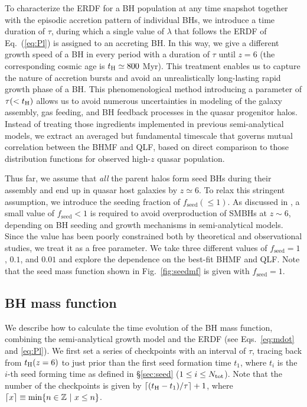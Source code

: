 \documentclass[twocolumn, twocolappendix]{aastex63}
\newcommand{\tlife}{\tau}
\newcommand{\fseed}{f_\mathrm{seed}}
\newcommand{\Nt}{N_\mathrm{t}}
\begin{document}
\begin{CJK*}{UTF8}{gbsn}
To characterize the ERDF for a BH population at any time snapshot together with the episodic 
accretion pattern of individual BHs, 
we introduce a time duration of $\tlife$, during which a single value of $\lambda$ that follows 
the ERDF of Eq.~(\ref{eq:Pl}) is assigned to an accreting BH.
In this way, we give a different growth speed of a BH in every period with a duration of $\tlife$ until $z=6$ 
(the corresponding cosmic age is $t_{\rm H}\simeq 800$ Myr).
This treatment enables us to capture the nature of accretion bursts and avoid an unrealistically 
long-lasting rapid growth phase of a BH.
This phenomenological method introducing a parameter of $\tlife(<t_{\rm H})$ allows us to avoid 
numerous uncertainties in modeling of the galaxy assembly, gas feeding, and BH feedback processes in the quasar 
progenitor halos.
Instead of treating those ingredients implemented in previous semi-analytical models, we extract 
an averaged but fundamental timescale that governs mutual correlation between the BHMF and QLF,
based on direct comparison to those distribution functions for observed high-$z$ quasar population.


Thus far, we assume that {\it all} the parent halos form seed BHs during their assembly and end up in quasar host galaxies by $z\simeq 6$.
To relax this stringent assumption, we introduce the seeding fraction of $\fseed (\leq 1)$.
As discussed in \citet{2009ApJ...696.1798T}, a small value of $\fseed <1$ is required to avoid overproduction of SMBHs at $z\sim 6$,
depending on BH seeding and growth mechanisms in semi-analytical models.
Since the value has been poorly constrained both by theoretical and observational studies, we treat it as a free parameter.
We take three different values of $\fseed = 1$, $0.1$, and $0.01$ and explore the dependence on the best-fit BHMF and QLF.
Note that the seed mass function shown in Fig.~\ref{fig:seedmf} is given with $\fseed = 1$.



\subsection{BH mass function}\label{sec:MF}

We describe how to calculate the time evolution of the BH mass function, 
combining the semi-analytical growth model and the ERDF (see Eqs.~\ref{eq:mdot} and \ref{eq:Pl}).
We first set a series of checkpoints with an interval of $\tlife$, 
tracing back from $t_{\rm H}(z=6)$ to just prior than the first seed formation time $t_1$, where $t_i$ is the $i$-th seed forming time
as defined in \S\ref{sec:seed} ($1\leq i\leq N_{\rm tot}$).
Note that the number of the checkpoints is given by $\lceil (t_{\rm H}-t_1)/\tau \rceil+1$, where $\lceil x\rceil \equiv {\rm min}\{n \in \mathbb{Z}~ |~x\leq n\}$.


\end{CJK*}
\end{document}
